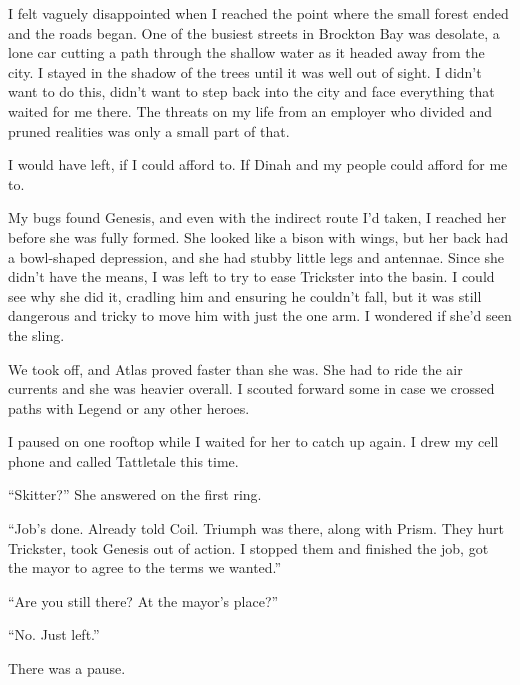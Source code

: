 I felt vaguely disappointed when I reached the point where the small forest ended and the roads began.  One of the busiest streets in Brockton Bay was desolate, a lone car cutting a path through the shallow water as it headed away from the city.  I stayed in the shadow of the trees until it was well out of sight.  I didn't want to do this, didn't want to step back into the city and face everything that waited for me there.  The threats on my life from an employer who divided and pruned realities was only a small part of that.



I would have left, if I could afford to.  If Dinah and my people could afford for me to.



My bugs found Genesis, and even with the indirect route I'd taken, I reached her before she was fully formed.  She looked like a bison with wings, but her back had a bowl-shaped depression, and she had stubby little legs and antennae.  Since she didn't have the means, I was left to try to ease Trickster into the basin.  I could see why she did it, cradling him and ensuring he couldn't fall, but it was still dangerous and tricky to move him with just the one arm.  I wondered if she'd seen the sling.



We took off, and Atlas proved faster than she was.  She had to ride the air currents and she was heavier overall.  I scouted forward some in case we crossed paths with Legend or any other heroes.



I paused on one rooftop while I waited for her to catch up again.  I drew my cell phone and called Tattletale this time.



``Skitter?'' She answered on the first ring.



``Job's done.  Already told Coil.  Triumph was there, along with Prism.  They hurt Trickster, took Genesis out of action.  I stopped them and finished the job, got the mayor to agree to the terms we wanted.''



``Are you still there?  At the mayor's place?''



``No.  Just left.''



There was a pause.



